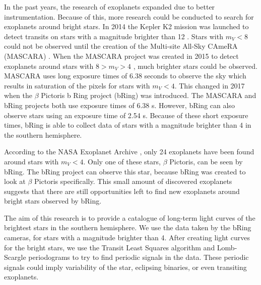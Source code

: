 \documentclass[onecolumn]{aa} %
\begin{document}
In the past years, the research of exoplanets expanded due to better instrumentation.
%
Because of this, more research could be conducted to search for exoplanets around bright stars.
%
In 2014 the Kepler K2 mission was launched to detect transits on stars with a magnitude brighter than 12 \citep{Howell_2014}.
%
Stars with $m_V<8$ could not be observed until the creation of the Multi-site All-Sky CAmeRA (MASCARA) \citep{mascara}.
%
When the MASCARA project was created in 2015 to detect exoplanets around stars with $8 > m_V > 4$ \citep{Talens_2017}, much brighter stars could be observed.
%
MASCARA uses long exposure times of 6.38 seconds to observe the sky which results in saturation of the pixels for stars with $m_V < 4$.
%
This changed in 2017 when the $\beta$ Pictoris b Ring project (bRing) \citep{bring} was introduced.
%
The MASCARA and bRing projects both use exposure times of 6.38 s.
%
However, bRing can also observe stars using an exposure time of 2.54 s.
%
Because of these short exposure times, bRing is able to collect data of stars with a magnitude brighter than 4 in the southern hemisphere.

According to the NASA Exoplanet Archive \citep{NASA_Exoplanet_Archive}, only 24 exoplanets have been found around stars with $m_V < 4$.
%
Only one of these stars, $\beta$ Pictoris, can be seen by bRing.
%
The bRing project can observe this star, because bRing was created to look at $\beta$ Pictoris specifically.
%
This small amount of discovered exoplanets suggests that there are still opportunities left to find new exoplanets around bright stars observed by bRing.

The aim of this research is to provide a catalogue of long-term light curves of the brightest stars in the southern hemisphere.
%
We use the data taken by the bRing cameras, for stars with a magnitude brighter than 4.
%
After creating light curves for the bright stars, we use the Transit Least Squares algorithm \citep{Hippke_2019} and Lomb-Scargle periodograms \citep{VanderPlas_2012,VanderPlas_2015} to try to find periodic signals in the data.
%
These periodic signals could imply variability of the star, eclipsing binaries, or even transiting exoplanets.

%
%
%
%
%
%
\end{document}
